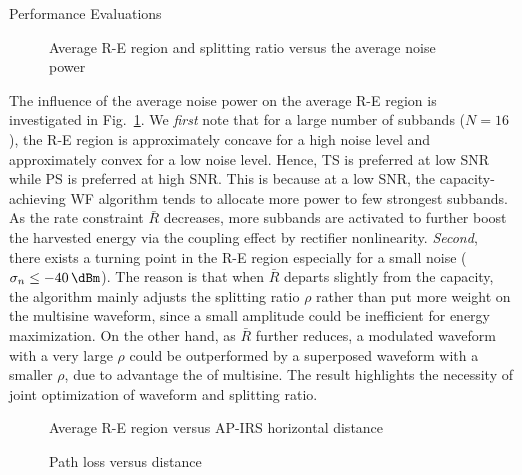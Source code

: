\documentclass[journal]{IEEEtran}
\begin{document}
\begin{section}{Performance Evaluations}
		\begin{figure}[!t]
			\centering
			\begin{adjustbox}{width=\linewidth}
				
			\end{adjustbox}
			\caption{Average R-E region and splitting ratio versus the average noise power}
			\label{fi:re_noise}
		\end{figure}

		The influence of the average noise power on the average R-E region is investigated in Fig.~\ref{fi:re_noise}. We \textit{first} note that for a large number of subbands ($N=16$), the R-E region is approximately concave for a high noise level and approximately convex for a low noise level. Hence, TS is preferred at low SNR while PS is preferred at high SNR. This is because at a low SNR, the capacity-achieving WF algorithm tends to allocate more power to few strongest subbands. As the rate constraint $\bar{R}$ decreases, more subbands are activated to further boost the harvested energy via the coupling effect by rectifier nonlinearity. \textit{Second}, there exists a turning point in the R-E region especially for a small noise ($\sigma_n \le -40\,\si{\dBm}$). The reason is that when $\bar{R}$ departs slightly from the capacity, the algorithm mainly adjusts the splitting ratio $\rho$ rather than put more weight on the multisine waveform, since a small amplitude could be inefficient for energy maximization. On the other hand, as $\bar{R}$ further reduces, a modulated waveform with a very large $\rho$ could be outperformed by a superposed waveform with a smaller $\rho$, due to advantage the of multisine. The result highlights the necessity of joint optimization of waveform and splitting ratio.

		\begin{figure}[!t]
			\centering
			\begin{adjustbox}{width=\linewidth}
				
			\end{adjustbox}
			\caption{Average R-E region versus AP-IRS horizontal distance}
			\label{fi:re_distance}
		\end{figure}

		\begin{figure}[!t]
			\centering
			\begin{adjustbox}{width=\linewidth}
				
			\end{adjustbox}
			\caption{Path loss versus distance}
			\label{fi:path_loss}
		\end{figure}


\end{section}
\end{document}
